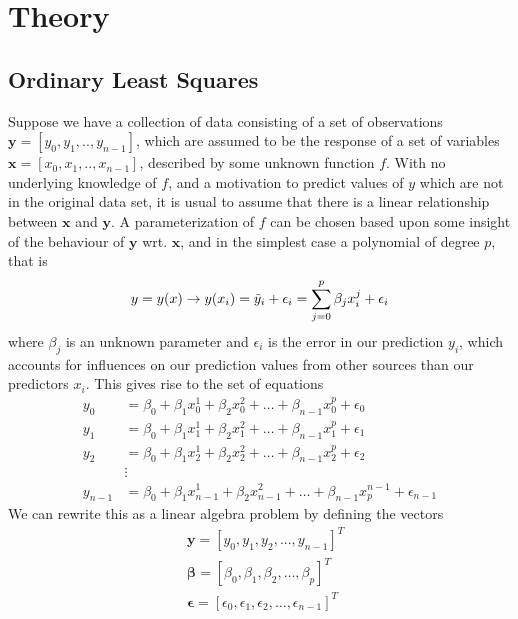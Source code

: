 \section{Theory}\label{sec:Theory}

\subsection{Ordinary Least Squares}
Suppose we have a collection of data consisting of a set of observations $\textbf{y} = [y_0, y_1, .., y_{n-1}]$, which are assumed to be the response of a set of variables $\textbf{x} = [x_0, x_1, .., x_{n-1}]$, described by some unknown function $f$. With no underlying knowledge of $f$, and a motivation to predict values of $y$ which are not in the original data set, it is usual to assume that there is a linear relationship between $\textbf{x}$ and $\textbf{y}$. A parameterization of $f$ can be chosen based upon some insight of the behaviour of $\textbf{y}$ wrt. $\textbf{x}$, and in the simplest case a polynomial of degree $p$, that is 
\begin{align}
    \label{eq:linearModel}
    y = y(x) \rightarrow y(x_i) = \Tilde{y}_i + \epsilon_i = \sum_{j=0}^{p}\beta_jx_i^j + \epsilon_i
\end{align}
where $\beta_j$ is an unknown parameter and $\epsilon_i$ is the error in our prediction $y_i$, which accounts for influences on our prediction values from other sources than our predictors $x_i$. This gives rise to the set of equations
\begin{align*}
    y_0&=\beta_0+\beta_1x_0^1+\beta_2x_0^2+\dots+\beta_{n-1}x_0^{p}+\epsilon_0\\
    y_1&=\beta_0+\beta_1x_1^1+\beta_2x_1^2+\dots+\beta_{n-1}x_1^{p}+\epsilon_1\\
    y_2&=\beta_0+\beta_1x_2^1+\beta_2x_2^2+\dots+\beta_{n-1}x_2^{p}+\epsilon_2\\
    &\vdots \\
    y_{n-1}&=\beta_0+\beta_1x_{n-1}^1+\beta_2x_{n-1}^2+\dots+\beta_{n-1}x_{p}^{n-1}+\epsilon_{n-1}
\end{align*}
We can rewrite this as a linear algebra problem by defining the vectors
\begin{align*}
    &\textbf{y} = [y_0,y_1, y_2,..., y_{n-1}]^T\\
    &\boldsymbol{\beta} = [\beta_0,\beta_1, \beta_2,\dots, \beta_{p}]^T\\
    &\boldsymbol{\epsilon} = [\epsilon_0,\epsilon_1, \epsilon_2,\dots, \epsilon_{n-1}]^T
\end{align*}
